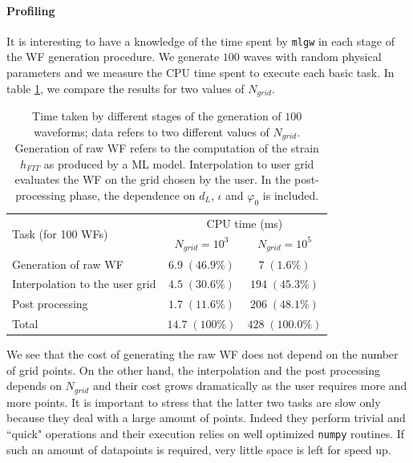 \paragraph{Profiling}
It is interesting to have a knowledge of the time spent by \texttt{mlgw} in each stage of the WF generation procedure.
We generate $100$ waves with random physical parameters and we measure the CPU time spent to execute each basic task.
In table \ref{tab:profiling}, we compare the results for two values of $N_{grid}$.
\begin{table}
	\def\arraystretch{1.5}
	\begin{tabular}{ l c c }
		\multirow{2}{*}{Task (for 100 WFs)}& \multicolumn{2}{c}{CPU time (ms)}\\
			&$N_{grid} = 10^3$	& $N_{grid} = 10^5$\\
	\hline \hline
		 Generation of raw WF 			& $6.9 \; (46.9\%)$	& $7 \; (1.6\%)$ \\ 
	\hline
		 Interpolation to the user grid & $4.5 \; (30.6\%)$	& $194 \; (45.3\%)$ \\ 
	\hline
		 Post processing 				& $1.7 \; (11.6\%)$	& $206 \; (48.1\%)$ \\
	\hline
		 Total							& $14.7 \; (100\%)$ &  $428 \; (100.0\%)$ \\
	\hline \hline
	\end{tabular}
	\caption{
Time taken by different stages of the generation of $100$ waveforms; data refers to two different values of $N_{grid}$.
Generation of raw WF refers to the computation of the strain $h_{FIT}$ as produced by a ML model. 
Interpolation to user grid evaluates the WF on the grid chosen by the user. In the post-processing phase, the dependence on $d_L$, $\iota$ and $\varphi_0$ is included.
}
	\label{tab:profiling}
\end{table}
\par
We see that the cost of generating the raw WF does not depend on the number of grid points. 
On the other hand, the interpolation and the post processing depends on $N_{grid}$ and their 
cost grows dramatically as the user requires more and more points. It is important to stress that 
the latter two tasks are slow only because they deal with a large amount of points. Indeed they perform 
trivial and ``quick" operations and their execution relies on well optimized \texttt{numpy} routines.
If such an amount of datapoints is required, very little space is left for speed up.



